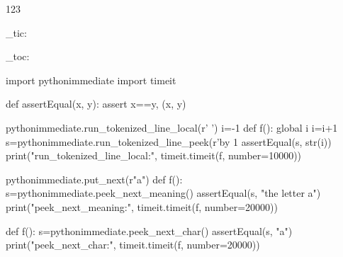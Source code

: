 \documentclass{article}
\begin{document}
123

\ExplSyntaxOn \benchmark_tic: \ExplSyntaxOff
\begin{pycode}

\end{pycode}
\ExplSyntaxOn \benchmark_toc: \ExplSyntaxOff

\begin{pycode}
import pythonimmediate
import timeit

def assertEqual(x, y):
	assert x==y, (x, y)

pythonimmediate.run_tokenized_line_local(r'\newcount\counta {} ')
i=-1
def f():
	global i
	i=i+1
	s=pythonimmediate.run_tokenized_line_peek(r'\advance\counta by 1 \pythonimmediatecontinue{\the\counta}%
	assertEqual(s, str(i))
print("run_tokenized_line_local:", timeit.timeit(f, number=10000))

pythonimmediate.put_next(r"a")
def f():
	s=pythonimmediate.peek_next_meaning()
	assertEqual(s, "the letter a")
print("peek_next_meaning:", timeit.timeit(f, number=20000))

def f():
	s=pythonimmediate.peek_next_char()
	assertEqual(s, "a")
print("peek_next_char:", timeit.timeit(f, number=20000))

\end{pycode}
\end{document}
